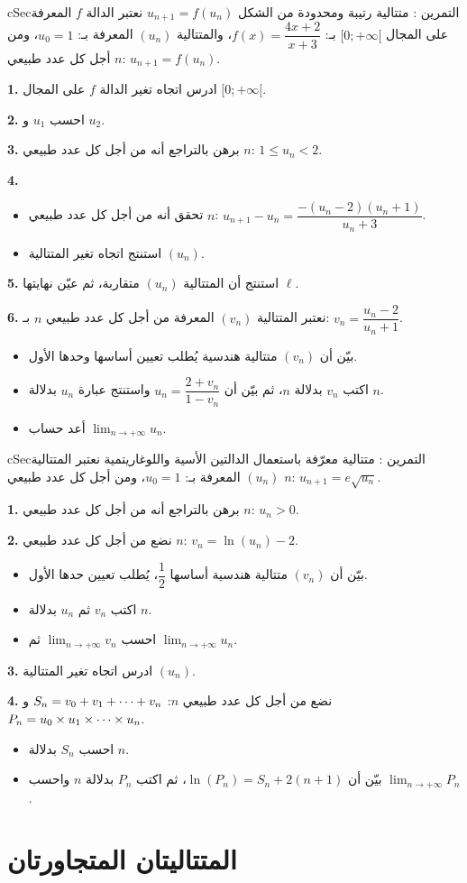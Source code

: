\documentclass[12pt,a4paper]{article}
\newenvironment{BOX}[2]{\begin{otherlanguage}{english}\begin{arbox}{#1}{#2}}{\end{arbox}\end{otherlanguage}}
\newcounter{exo}
\newenvironment{tamrin}[1]{\stepcounter{exo}\begin{BOX}{cSec}{التمرين \theexo: #1}}{\end{BOX}}
\renewcommand{\cdots}{\mathinner{\cdotp\cdotp\cdotp}}
\newcommand{\limn}{\displaystyle\lim_{n\to+\infty}}
\newenvironment{sq}{\begin{itemize}[leftmargin=2.4em,itemsep=3pt]}{\end{itemize}}
\newcommand{\qa}{\item[(أ)]}\newcommand{\qb}{\item[(ب)]}\newcommand{\qc}{\item[(جـ)]}\newcommand{\qd}{\item[(د)]}\newcommand{\qe}{\item[(هـ)]}
\newcommand{\QQ}[1]{\par\smallskip\textbf{#1.} }
\begin{document}
\begin{tamrin}{متتالية رتيبة ومحدودة من الشكل $u_{n+1}=f(u_n)$}
نعتبر الدالة $f$ المعرفة على المجال $[0;+\infty[$ بـ: $f(x)=\dfrac{4x+2}{x+3}$، والمتتالية $(u_n)$ المعرفة بـ: $u_0=1$، ومن أجل كل عدد طبيعي $n$: $u_{n+1}=f(u_n)$.
\QQ{1} ادرس اتجاه تغير الدالة $f$ على المجال $[0;+\infty[$.
\QQ{2} احسب $u_1$ و $u_2$.
\QQ{3} برهن بالتراجع أنه من أجل كل عدد طبيعي $n$: $1\leqslant u_n<2$.
\QQ{4}
\begin{sq}
\qa تحقق أنه من أجل كل عدد طبيعي $n$: $u_{n+1}-u_n=\dfrac{-(u_n-2)(u_n+1)}{u_n+3}$.
\qb استنتج اتجاه تغير المتتالية $(u_n)$.
\end{sq}
\QQ{5} استنتج أن المتتالية $(u_n)$ متقاربة، ثم عيّن نهايتها $\ell$.
\QQ{6} نعتبر المتتالية $(v_n)$ المعرفة من أجل كل عدد طبيعي $n$ بـ: $v_n=\dfrac{u_n-2}{u_n+1}$.
\begin{sq}
\qa بيّن أن $(v_n)$ متتالية هندسية يُطلب تعيين أساسها وحدها الأول.
\qb اكتب $v_n$ بدلالة $n$، ثم بيّن أن $u_n=\dfrac{2+v_n}{1-v_n}$ واستنتج عبارة $u_n$ بدلالة $n$.
\qc أعد حساب $\limn u_n$.
\end{sq}
\end{tamrin}

\begin{tamrin}{متتالية معرّفة باستعمال الدالتين الأسية واللوغاريتمية}
نعتبر المتتالية $(u_n)$ المعرفة بـ: $u_0=1$، ومن أجل كل عدد طبيعي $n$: $u_{n+1}=e\sqrt{u_n}$.
\QQ{1} برهن بالتراجع أنه من أجل كل عدد طبيعي $n$: $u_n>0$.
\QQ{2} نضع من أجل كل عدد طبيعي $n$: $v_n=\ln\left(u_n\right)-2$.
\begin{sq}
\qa بيّن أن $(v_n)$ متتالية هندسية أساسها $\dfrac12$، يُطلب تعيين حدها الأول.
\qb اكتب $v_n$ ثم $u_n$ بدلالة $n$.
\qc احسب $\limn v_n$ ثم $\limn u_n$.
\end{sq}
\QQ{3} ادرس اتجاه تغير المتتالية $(u_n)$.
\QQ{4} نضع من أجل كل عدد طبيعي $n$: $S_n=v_0+v_1+\cdots+v_n$ و $P_n=u_0\times u_1\times\cdots\times u_n$.
\begin{sq}
\qa احسب $S_n$ بدلالة $n$.
\qb بيّن أن $\ln\left(P_n\right)=S_n+2(n+1)$، ثم اكتب $P_n$ بدلالة $n$ واحسب $\limn P_n$.
\end{sq}
\end{tamrin}

\section{المتتاليتان المتجاورتان}
\end{document}
